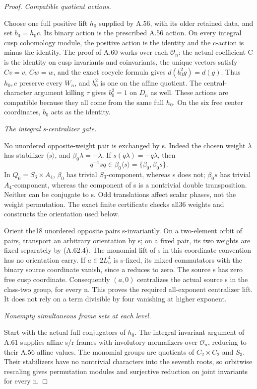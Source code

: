 \begin{proof}
\emph{Compatible quotient actions.}\par
Choose one full positive lift \(h_0\) supplied by A.56,
with its older retained data, and set \(b_0=h_0c\).
Its binary action is the prescribed A.56 action. On every
integral cusp cohomology module, the positive action is
the identity and the c-action is minus the identity.
The proof of A.60 works over each \(\mathcal O_n\): the
actual coefficient C is the identity on cusp invariants
and coinvariants, the unique vectors satisfy \(Cv=v\),
\(Cw=w\), and the exact cocycle formula gives
\(d(b_0^2g)=d(g)\). Thus \(h_0,c\) preserve every
\(W_n\), and \(b_0^2\) is one on the affine quotient.
The central-character argument killing \(\tau\) gives
\(b_0^2=1\) on \(D_n\) as well. These actions are
compatible because they all come from the same full
\(h_0\). On the six free center coordinates, \(b_0\)
acts as the identity.

\emph{The integral s-centralizer gate.}\par
No unordered opposite-weight pair is exchanged by s.
Indeed the chosen weight \(\lambda\) has stabilizer
\(\langle s\rangle\), and \(\beta_0\lambda=-\lambda\).
If \(s(q\lambda)=-q\lambda\), then
\[
 q^{-1}sq\in\beta_0\langle s\rangle
             =\{\beta_0,\beta_0s\}.
 \tag{A.62.4}
\]
In \(Q_6=S_3\times A_4\), \(\beta_0\) has trivial
\(S_3\)-component, whereas s does not; \(\beta_0s\)
has trivial \(A_4\)-component, whereas the component of s
is a nontrivial double transposition. Neither can be
conjugate to s. Odd translations affect scalar phases,
not the weight permutation. The exact finite certificate
 checks all36 weights
and constructs the orientation used below.

Orient the18 unordered opposite pairs s-invariantly.
On a two-element orbit of pairs, transport an arbitrary
orientation by s; on a fixed pair, its two weights are
fixed separately by (A.62.4). The monomial lift of s in
this coordinate convention has no orientation carry.
If \(a\in2L_n^4\) is s-fixed, its mixed commutators with
the binary source coordinate vanish, since a reduces to
zero. The source s has zero free cusp coordinate.
Consequently \((a,0)\) centralizes the actual source s
in the class-two group, for every n. This proves the
required all-exponent centralizer lift. It does not rely
on a term divisible by four vanishing at higher exponent.

\emph{Nonempty simultaneous frame sets at each level.}\par
Start with the actual full conjugators of \(h_0\).
The integral invariant argument of A.61 supplies affine
s/r-frames with involutory normalizers over
\(\mathcal O_n\), reducing to their A.56 affine values.
The monomial groups are quotients of \(C_2\times C_2\)
and \(S_3\). Their stabilizers have no nontrivial
characters into the seventh roots, so orbitwise
rescaling gives permutation modules and surjective
reduction on joint invariants for every n.


\end{proof}
